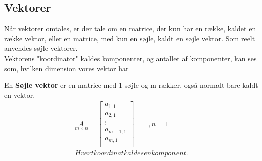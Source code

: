 \subsection{Vektorer}
Når vektorer omtales, er der tale om en matrice, der kun har en række, kaldet en række vektor, eller en matrice, med kun en søjle, kaldt en søjle vektor. Som reelt anvendes søjle vektorer. \\
Vektorens "koordinator" kaldes komponenter, og antallet af komponenter, kan ses som, hvilken dimension vores vektor har
\begin{defn}
En \textbf{Søjle vektor} er en matrice med 1 søjle og m rækker, også normalt bare kaldt en vektor.
\begin{align*}
\underset{m \times n}{A} = 
\begin{bmatrix}
a_{1,1}\\
a_{2,1}\\
\vdots \\
a_{m-1,1}\\
a_{m,1} \\
\end{bmatrix}\qquad , n=1\\ %
Hvert koordinat kaldes en komponent.
\end{align*} 
\end{defn}
